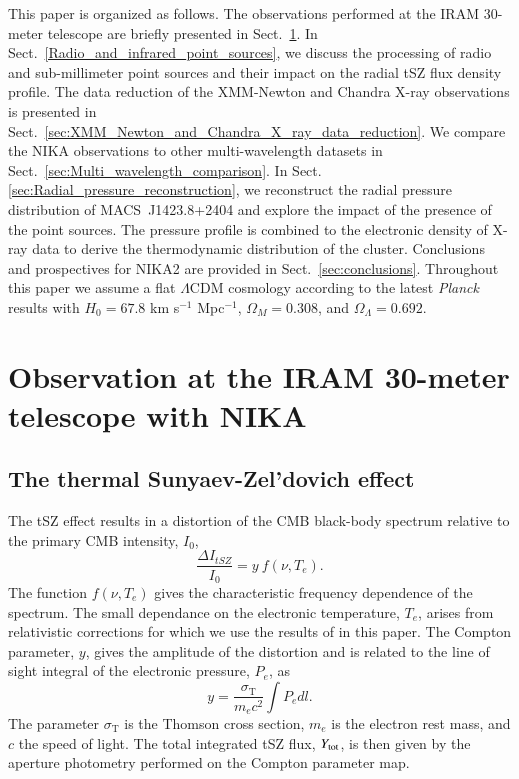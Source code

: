 \documentclass[twocolumn,traditabstract]{aa}
\begin{document}
This paper is organized as follows. The observations performed at the IRAM 30-meter telescope are briefly presented in Sect.~\ref{sec:Observation_at_the_IRAM_30m_telescope_with_NIKA}. In Sect.~\ref{Radio_and_infrared_point_sources}, we discuss the processing of radio and sub-millimeter point sources and their impact on the radial tSZ flux density profile. 
The data reduction of the XMM-Newton and Chandra X-ray observations is presented in Sect.~\ref{sec:XMM_Newton_and_Chandra_X_ray_data_reduction}. We compare the NIKA observations to other multi-wavelength datasets in Sect.~\ref{sec:Multi_wavelength_comparison}. In Sect. \ref{sec:Radial_pressure_reconstruction}, we reconstruct the radial pressure distribution of \mbox{MACS~J1423.8+2404} and explore the impact of the presence of the point sources. The pressure profile is combined to the electronic density of X-ray data to derive the thermodynamic distribution of the cluster. Conclusions and prospectives for NIKA2 are provided in Sect.~\ref{sec:conclusions}. Throughout this paper we assume a flat $\Lambda$CDM cosmology according to the latest {\it Planck} results \citep{planck2014param} with $H_0 = 67.8$ km s$^{-1}$ Mpc$^{-1}$, $\Omega_M = 0.308$, and $\Omega_{\Lambda} = 0.692$.

\section{Observation at the IRAM 30-meter telescope with NIKA}\label{sec:Observation_at_the_IRAM_30m_telescope_with_NIKA}
\subsection{The thermal Sunyaev-Zel'dovich effect}
The tSZ effect \citep{sunyaev1972,sunyaev1980} results in a distortion of the CMB black-body spectrum relative to the primary CMB intensity, $I_0$, \citep[e.g.][]{birkinshaw1999}
\begin{equation}
	\frac{\Delta I_{tSZ}}{I_0} = y \ f(\nu, T_e).
\label{eq:deltaI}
\end{equation}
The function $f(\nu, T_e)$ gives the characteristic frequency dependence of the spectrum. The small dependance on the electronic temperature, $T_e$, arises from relativistic corrections for which we use the results of \cite{itoh1998} in this paper. The Compton parameter, $y$, gives the amplitude of the distortion and is related to the line of sight integral of the electronic pressure, $P_e$, as 
\begin{equation}
	y = \frac{\sigma_{\mathrm{T}}}{m_{e} c^2} \int P_{e} dl.
	\label{eq:y_compton}
\end{equation}
The parameter $\sigma_{\mathrm{T}}$ is the Thomson cross section, $m_{e}$ is the electron rest mass, and $c$ the speed of light. The total integrated tSZ flux, $Y_{\rm tot}$, is then given by the aperture photometry performed on the Compton parameter map.
\end{document}
